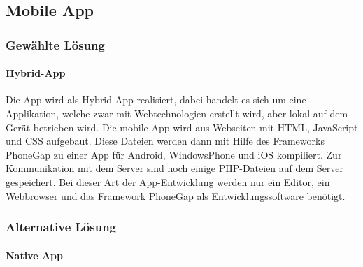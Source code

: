 \subsection{Mobile App}

\subsubsection{Gewählte Lösung}

\paragraph*{Hybrid-App\\}

Die App wird als Hybrid-App realisiert, dabei handelt es sich um eine Applikation, welche zwar mit Webtechnologien erstellt wird, aber lokal auf dem Gerät betrieben wird.
Die mobile App wird aus Webseiten mit HTML, JavaScript und CSS aufgebaut. Diese Dateien werden dann mit Hilfe des Frameworks PhoneGap zu einer App für Android, WindowsPhone und iOS kompiliert. Zur Kommunikation mit dem Server sind noch einige PHP-Dateien auf dem Server gespeichert.
Bei dieser Art der App-Entwicklung werden nur ein Editor, ein Webbrowser und das Framework PhoneGap als Entwicklungssoftware benötigt.

\subsubsection{Alternative Lösung}
\paragraph*{Native App\\}

